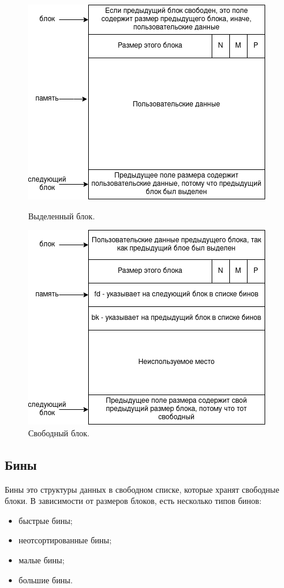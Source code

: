 \begin{figure}[!h]
	\begin{minipage}{0.5\textwidth}
		\includegraphics[scale=0.5]{images/glibc-malloc-allocated-chunk.png}
		\caption{Выделенный блок.}
		\label{glibc-malloc-allocated-chunk}
	\end{minipage}
	\begin{minipage}{0.5\textwidth}
		\includegraphics[scale=0.5]{images/glibc-malloc-free-chunk.png}
		\caption{Свободный блок.}
		\label{glibc-malloc-free-chunk}
	\end{minipage}
\end{figure}

\subsection{Бины}
Бины это структуры данных в свободном списке, которые хранят свободные блоки. В зависимости от размеров блоков, есть несколько типов бинов:
\begin{itemize}
	\item быстрые бины;
	\item неотсортированные бины;
	\item малые бины;
	\item большие бины.
\end{itemize}

